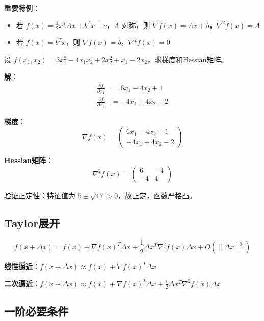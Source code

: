 \textbf{重要特例}：
\begin{itemize}
    \item 若 $f(x) = \frac{1}{2}x^T A x + b^T x + c$，$A$ 对称，则 $\nabla f(x) = Ax + b$，$\nabla^2 f(x) = A$
    \item 若 $f(x) = b^T x$，则 $\nabla f(x) = b$，$\nabla^2 f(x) = 0$
\end{itemize}

\begin{example}[计算梯度和Hessian矩阵]
设 $f(x_1, x_2) = 3x_1^2 - 4x_1x_2 + 2x_2^2 + x_1 - 2x_2$，求梯度和Hessian矩阵。

\textbf{解}：
\begin{align*}
\frac{\partial f}{\partial x_1} &= 6x_1 - 4x_2 + 1 \\
\frac{\partial f}{\partial x_2} &= -4x_1 + 4x_2 - 2
\end{align*}

\textbf{梯度}：
\[
\nabla f(x) = \begin{pmatrix} 6x_1 - 4x_2 + 1 \\ -4x_1 + 4x_2 - 2 \end{pmatrix}
\]

\textbf{Hessian矩阵}：
\[
\nabla^2 f(x) = \begin{pmatrix} 6 & -4 \\ -4 & 4 \end{pmatrix}
\]

验证正定性：特征值为 $5 \pm \sqrt{17} > 0$，故正定，函数严格凸。
\end{example}

\subsection{Taylor展开}\label{sec:taylor}

\begin{property}[多元函数的Taylor展开]
\[
f(x + \Delta x) = f(x) + \nabla f(x)^T \Delta x + \frac{1}{2} \Delta x^T \nabla^2 f(x) \Delta x + O(\|\Delta x\|^3)
\]

\textbf{线性逼近}：$f(x + \Delta x) \approx f(x) + \nabla f(x)^T \Delta x$

\textbf{二次逼近}：$f(x + \Delta x) \approx f(x) + \nabla f(x)^T \Delta x + \frac{1}{2} \Delta x^T \nabla^2 f(x) \Delta x$
\end{property}

\subsection{一阶必要条件}

